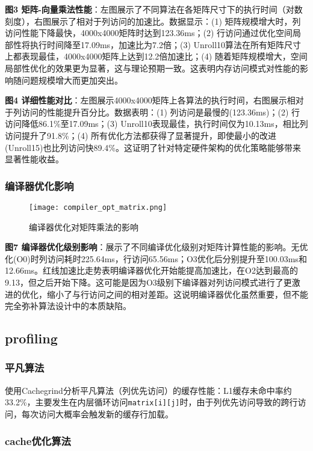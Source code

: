 \documentclass[a4paper,colorlinks=true,linkcolor=blue,urlcolor=blue,citecolor=green,bookmarks=true]{article}
\begin{document}
\textbf{图3 矩阵-向量乘法性能}：左图展示了不同算法在各矩阵尺寸下的执行时间（对数刻度），右图展示了相对于列访问的加速比。数据显示：(1) 矩阵规模增大时，列访问性能下降最快，4000x4000矩阵时达到123.36ms；(2) 行访问通过优化空间局部性将执行时间降至17.09ms，加速比为7.2倍；(3) Unroll10算法在所有矩阵尺寸上都表现最佳，4000x4000矩阵上达到12.2倍加速比；(4) 随着矩阵规模增大，空间局部性优化的效果更为显著，这与理论预期一致。这表明内存访问模式对性能的影响随问题规模增大而更加突出。

\textbf{图4 详细性能对比}：左图展示4000x4000矩阵上各算法的执行时间，右图展示相对于列访问的性能提升百分比。数据表明：(1) 列访问是最慢的(123.36ms)；(2) 行访问降低86.1\%至17.09ms；(3) Unroll10表现最佳，执行时间仅为10.13ms，相比列访问提升了91.8\%；(4) 所有优化方法都获得了显著提升，即使最小的改进(Unroll15)也比列访问快89.4\%。这证明了针对特定硬件架构的优化策略能够带来显著性能收益。

\subsubsection{编译器优化影响}

\begin{figure}[ht]
  \centering
  \texttt{[image: compiler\_opt\_matrix.png]}
  \caption{编译器优化对矩阵乘法的影响}
  \label{fig:compiler_opt_matrix}
\end{figure}

\textbf{图7 编译器优化级别影响}：展示了不同编译优化级别对矩阵计算性能的影响。无优化(O0)时列访问耗时225.64ms，行访问65.56ms；O3优化后分别提升至100.03ms和12.66ms。红线加速比走势表明编译器优化开始能提高加速比，在O2达到最高的9.13，但之后开始下降。这可能是因为O3级别下编译器对列访问模式进行了更激进的优化，缩小了与行访问之间的相对差距。这说明编译器优化虽然重要，但不能完全弥补算法设计中的本质缺陷。

\subsection{profiling}

\subsubsection{平凡算法}

使用Cachegrind分析平凡算法（列优先访问）的缓存性能：L1缓存未命中率约33.2\%，主要发生在内层循环访问\verb|matrix[i][j]|时，由于列优先访问导致的跨行访问，每次访问大概率会触发新的缓存行加载。

\subsubsection{cache优化算法}
\end{document}
